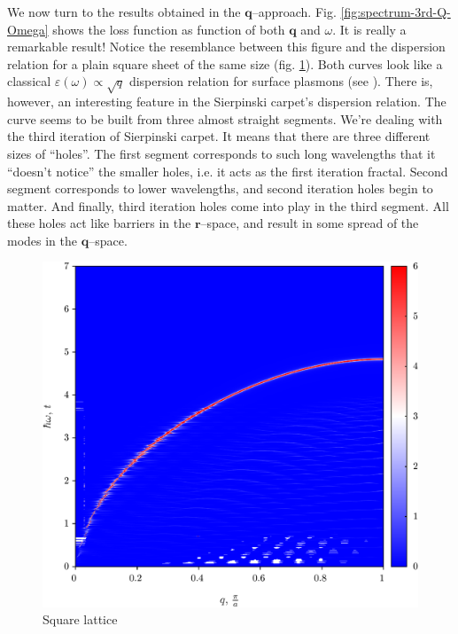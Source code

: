 \documentclass[a4paper,12pt]{article}
\begin{document}
    We now turn to the results obtained in the $\mathbf{q}$--approach. Fig. \ref{fig:spectrum-3rd-Q-Omega} shows the loss function as function of both $\mathbf{q}$ and $\omega$. It is really a remarkable result! Notice the resemblance between this figure and the dispersion relation for a plain square sheet of the same size (fig. \ref{fig:spectrum-SL-Q-Omega}). Both curves look like a classical $\varepsilon(\omega) \propto \sqrt{q}$ dispersion relation for surface plasmons (see \cite{giuliani2005quantum}). There is, however, an interesting feature in the Sierpinski carpet's dispersion relation. The curve seems to be built from three almost straight segments. We're dealing with the third iteration of Sierpinski carpet. It means that there are three different sizes of ``holes''. The first segment corresponds to such long wavelengths that it ``doesn't notice'' the smaller holes, i.e. it acts as the first iteration fractal. Second segment corresponds to lower wavelengths, and second iteration holes begin to matter. And finally, third iteration holes come into play in the third segment. All these holes act like barriers in the $\mathbf{r}$--space, and result in some spread of the modes in the $\mathbf{q}$--space.

    \begin{figure}[h]
    \center
    \includegraphics[width=\textwidth]{Spectrum-SL-Q-Omega.png}
    \caption{Square lattice}
    \label{fig:spectrum-SL-Q-Omega}
    \end{figure}
\end{document}
